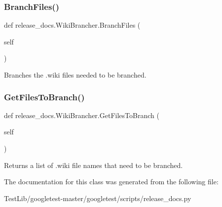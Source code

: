\subsubsection{\texorpdfstring{Branch\+Files()}{BranchFiles()}}
{\footnotesize\ttfamily def release\+\_\+docs.\+Wiki\+Brancher.\+Branch\+Files (\begin{DoxyParamCaption}\item[{}]{self }\end{DoxyParamCaption})}

\begin{DoxyVerb}Branches the .wiki files needed to be branched.\end{DoxyVerb}
 \mbox{\label{classrelease__docs_1_1WikiBrancher_a05fc4282f501fb0210ecb33fd1d209a6}} 
\subsubsection{\texorpdfstring{Get\+Files\+To\+Branch()}{GetFilesToBranch()}}
{\footnotesize\ttfamily def release\+\_\+docs.\+Wiki\+Brancher.\+Get\+Files\+To\+Branch (\begin{DoxyParamCaption}\item[{}]{self }\end{DoxyParamCaption})}

\begin{DoxyVerb}Returns a list of .wiki file names that need to be branched.\end{DoxyVerb}
 

The documentation for this class was generated from the following file\+:\begin{DoxyCompactItemize}
\item 
Test\+Lib/googletest-\/master/googletest/scripts/release\+\_\+docs.\+py\end{DoxyCompactItemize}
